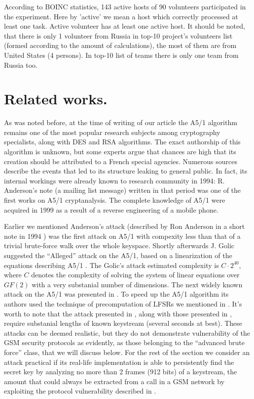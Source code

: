 \documentclass[runningheads,a4paper]{llncs}[2015/06/24]
\begin{document}
According to BOINC statistics, 143 active hosts of 90 volunteers participated
in the experiment. Here by 'active' we mean a host which correctly processed
at least one task. Active volunteer has at least one active host. It should be
noted, that there is only 1 volunteer from Russia in top-10 project's volunteers list
(formed according to the amount of calculations), the most of them are from United
States (4 persons). In top-10 list of teams there is only one team from Russia
too.

\section{Related works.}\label{sec:related}

As was noted before, at the time of writing of our article the A5/1 algorithm
remains one of the most popular research subjects among cryptography
specialists, along with DES and RSA algorithms. The exact authorship of this
algorithm is unknown, but some experts argue that chances are high that its
creation should be attributed to a French special agencies. Numerous sources
describe the events that led to its structure leaking to general public. In
fact, its internal workings were already known to research community in 1994:
R. Anderson's note (a mailing list message) written in that period was one of
the first works on A5/1 cryptanalysis. The complete knowledge of A5/1 were
acquired in 1999 as a result of a reverse engineering of a mobile phone.

Earlier we mentioned Anderson's attack (described by Ron Anderson in a short
note in 1994 \cite{ANDERSON}) was the first attack on A5/1 with compexity less
than that of a trivial brute-force walk over the whole keyspace. Shortly
afterwards J. Golic suggested the ``Alleged'' attack on the A5/1, based on a
linearization of the equations describing A5/1 \cite{Golic1997}. The Golic's attack
estimated complexity is $C \cdot 2^{40}$, where $C$ denotes the complexity of
solving the system of linear equations over $GF(2)$ with a very substanial
number of dimensions. The next widely known attack on the A5/1 was presented in
\cite{DBLP:conf/fse/BiryukovSW00}. To speed up the A5/1 algorithm its authors used the technique of
precomputation of LFSRs we mentioned in . It's worth to note
that the attack presented in \cite{DBLP:conf/fse/BiryukovSW00}, along with those presented in
\cite{Biham2000,DBLP:journals/tit/EkdahlJ03,Barkan2008}, require substanial
lengths of known keystream (several seconds at best). These attacks can be
deemed realistic, but they do not demonstrate vulnerability of the GSM security
protocols as evidently, as those belonging to the ``advanced brute force'' class,
that we will discuss below. For the rest of the section we consider an attack
practical if its real-life implementation is able to persistently find the
secret key by analyzing no more than 2 frames (912 bits) of a keystream, the
amount that could always be extracted from a call in a GSM network by
exploiting the protocol vulnerability described in .
\end{document}
